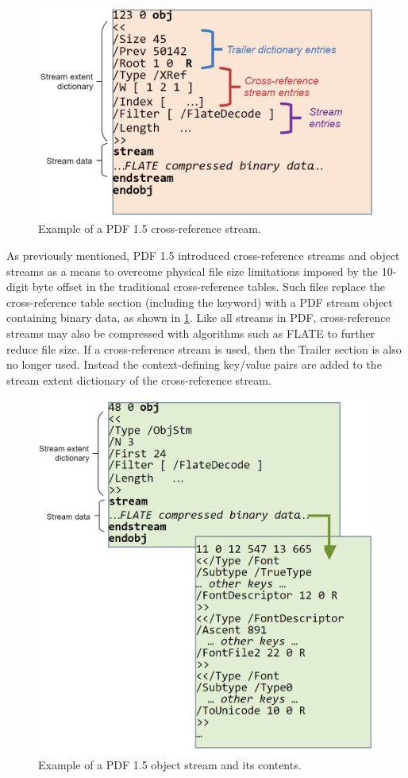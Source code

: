 \begin{figure}[t]
    \centering
    \includegraphics[width=0.65\linewidth]{figures/xrefstm.png}
    \caption{Example of a PDF 1.5 cross-reference stream.}
    \label{fig:XRefStm}
\end{figure}

As previously mentioned, PDF 1.5 introduced cross-reference streams and object streams as a means
to overcome physical file size limitations imposed by the 10-digit byte offset in the traditional
cross-reference tables.
Such files replace the cross-reference table section (including the  keyword) 
with a PDF stream object containing binary data, as shown in \cref{fig:XRefStm}. 
Like all streams in PDF, cross-reference streams may also be compressed with algorithms such as FLATE 
to further reduce file size. If a cross-reference stream is used, then the Trailer section is also no
longer used. Instead the context-defining key/value pairs are added to the stream extent dictionary of the cross-reference stream.

\begin{figure}[t]
    \centering
    \includegraphics[width=0.65\linewidth]{figures/ObjStm.png}
    \caption{Example of a PDF 1.5 object stream and its contents.}
    \label{fig:ObjStm}
\end{figure}

